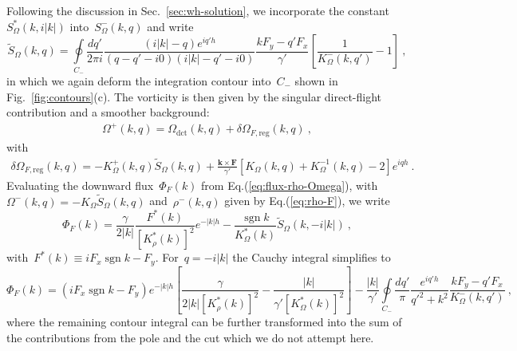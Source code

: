 \documentclass[preprint,aps,eqsecnum, prb]{revtex4-1}
\newcommand{\fplus}[1]{{#1}^{+}}
\newcommand{\fminus}[1]{{#1}^{-}}
\newcommand{\sgn}{\mathop{\mathrm{sgn}}\nolimits}
\newcommand{\dct}[1]{{#1}_\mathrm{dct}}
\begin{document}
Following the discussion in Sec.~\ref{sec:wh-solution}, we incorporate
the constant~$S_\Omega^\ast(k, i|k|)$ into~$\fminus{S}_\Omega(k, q)$ and write 
\begin{equation}
  \tilde{S}_\Omega(k, q) =
  \oint\limits_{C_{-}}
  \frac{dq'}{2\pi i}
  \frac{(i|k| - q) e^{iq'h}}{(q - q' - i0)(i|k| - q' - i0)}
  \frac{k F_y - q'F_x}{\gamma'}
  \left[\frac{1}{\fminus{K}_\Omega(k, q')} - 1 \right]
  \ , 
\end{equation}
in which we again deform the integration contour into~$C_{-}$
shown in Fig.~\ref{fig:contours}(c). 
The vorticity is then given by the singular direct-flight contribution
and a smoother background:
\begin{align}
  \label{eq:Omega-F}
  \fplus{\Omega}(k, q) =  \dct{\Omega}(k, q)
  + \delta\Omega_{F, \mathrm{reg}}(k, q)\ , 
\end{align}
with
\begin{align}
  \label{eq:dOmega-F}
  \delta\Omega_{F, \mathrm{reg}}(k, q)
  = - \fplus{K}_{\Omega}(k, q){\tilde S}_{\Omega}(k, q)
  + \frac{{\bm k} \times {\bm F}}{\gamma'}
  \left[K_\Omega(k, q) + K^{-1}_\Omega(k, q) - 2\right] e^{iqh}\ . 
\end{align}
Evaluating the downward flux~$\Phi_F(k)$ from Eq.(\ref{eq:flux-rho-Omega}),
with~$\fminus{\Omega}(k, q) = - K_\Omega \tilde{S}_\Omega(k, q)$
and~$\fminus{\rho}(k, q)$ given by Eq.(\ref{eq:rho-F}),
we write
\begin{equation}
  \Phi_F(k) = \frac{\gamma}{2|k|}\frac{F^\ast(k)}{
    \left[K_\rho^\ast(k)\right]^2}
  e^{-|k| h} - \frac{\sgn k}{K_\Omega^\ast(k)} \tilde{S}_\Omega(k, -i|k|)
  \ , 
\end{equation}
with~$F^\ast(k) \equiv i F_x \sgn k - F_y$. For~$q = -i|k|$
the Cauchy integral simplifies to 
\begin{equation}
  \Phi_F(k) =  (i F_x \sgn k - F_y)e^{-|k|h}
  \left[\frac{\gamma}{2|k|\left[K_\rho^\ast(k)\right]^2}
    - \frac{|k|}{\gamma'\left[K_\Omega^\ast(k)\right]^2 }\right]
  -  \frac{|k|}{\gamma'}\oint\limits_{C_{-}}
    \frac{dq'}{\pi} \frac{e^{iq'h}}{q'^2 + k^2}
     \frac{k F_y - q'F_x}{\fminus{K}_\Omega(k, q')}
     \ , 
\end{equation}
where the remaining contour integral  can be further transformed into the
sum of the contributions from the pole and the cut which we do not
attempt here. 
\end{document}
